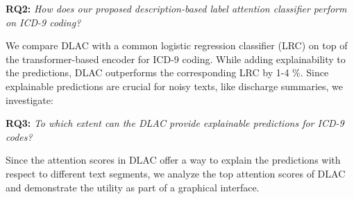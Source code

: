\documentclass[11pt]{article}
\begin{document}
\textbf{RQ2:} \textit{How does our proposed description-based label attention classifier perform on ICD-9 coding?}

We compare DLAC with a common logistic regression classifier (LRC) on top of the transformer-based encoder for ICD-9 coding. While adding explainability to the predictions, DLAC outperforms the corresponding LRC by 1-4 \%. 
Since explainable predictions are crucial for noisy texts, like discharge summaries, we investigate:

\textbf{RQ3:} \textit{To which extent can the DLAC provide explainable predictions for ICD-9 codes?}

Since the attention scores in DLAC offer a way to explain the predictions with respect to different text segments, we analyze the top attention scores of DLAC and demonstrate the utility as part of a graphical interface.
\end{document}
